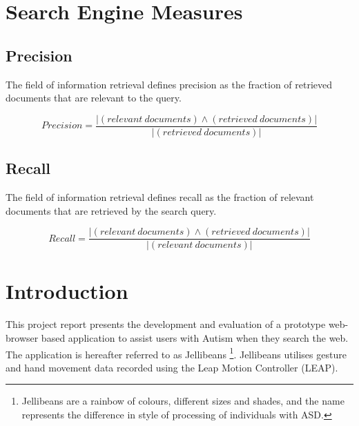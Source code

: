\documentclass[a4paper, 11pt]{article}
\begin{document}
\section*{Search Engine Measures}
\newcommand{\cfplus}{\mathbin{\genfrac{}{}{0pt}{}{}{+}}}

\subsection*{Precision}
The field of information retrieval defines precision as the fraction of retrieved documents that are relevant to the query. 

\begin{equation*}
Precision
=\frac{|(relevant\ documents) \land (retrieved\ documents)|}{|(retrieved\ documents)|}
\end{equation*}

\subsection*{Recall}
The field of information retrieval defines recall as the fraction of relevant documents that are retrieved by the search query. 

\begin{equation*}
Recall
=\frac{|(relevant\ documents) \land (retrieved\ documents)|}{|(relevant\ documents)|}
\end{equation*}
\clearpage

\section{Introduction}\label{intro}

This project report presents the development and evaluation of a prototype web-browser based application to assist users with Autism when they search the web. The application is hereafter referred to as Jellibeans \footnote{Jellibeans are a rainbow of colours, different sizes and shades, and the name represents the difference in style of processing of individuals with ASD.}. Jellibeans utilises gesture and hand movement data recorded using the Leap Motion Controller (LEAP). 
\vspace{5mm}
\end{document}
